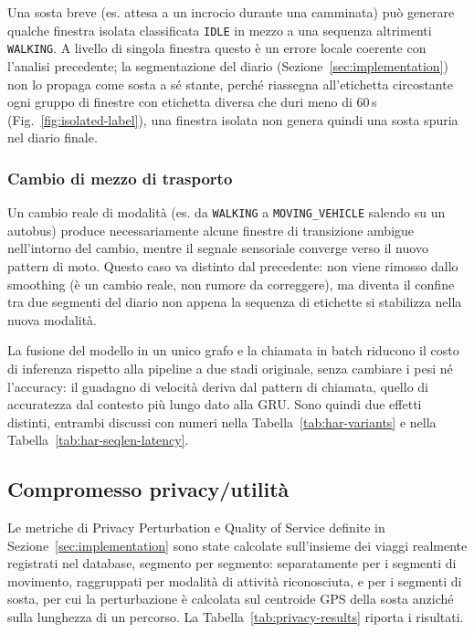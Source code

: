 \documentclass[conference]{IEEEtran}
\begin{document}
Una sosta breve
(es. attesa a un incrocio durante una camminata) può generare qualche
finestra isolata classificata \texttt{IDLE} in mezzo a una sequenza
altrimenti \texttt{WALKING}. A livello di singola finestra questo è un
errore locale coerente con l'analisi precedente; la segmentazione del
diario (Sezione~\ref{sec:implementation}) non lo propaga come sosta a
sé stante, perché riassegna all'etichetta circostante ogni gruppo di
finestre con etichetta diversa che duri meno di 60\,s
(Fig.~\ref{fig:isolated-label}), una finestra isolata non genera
quindi una sosta spuria nel diario finale.

\subsubsection{Cambio di mezzo di trasporto}

Un cambio reale di modalità
(es. da \texttt{WALKING} a \texttt{MOVING\_VEHICLE} salendo su un
autobus) produce necessariamente alcune finestre di transizione
ambigue nell'intorno del cambio, mentre il segnale sensoriale converge
verso il nuovo pattern di moto. Questo caso va distinto dal
precedente: non viene rimosso dallo smoothing (è un cambio reale, non
rumore da correggere), ma diventa il confine tra due segmenti del
diario non appena la sequenza di etichette si stabilizza nella nuova
modalità.

La fusione del modello in un unico grafo e la chiamata in batch
riducono il costo di inferenza rispetto alla pipeline a due stadi
originale, senza cambiare i pesi né l'accuracy: il guadagno di
velocità deriva dal pattern di chiamata, quello di accuratezza dal
contesto più lungo dato alla GRU. Sono quindi due effetti distinti,
entrambi discussi con numeri nella Tabella~\ref{tab:har-variants} e
nella Tabella~\ref{tab:har-seqlen-latency}.

\subsection{Compromesso privacy/utilità}

Le metriche di Privacy Perturbation e Quality of Service definite in
Sezione~\ref{sec:implementation} sono state calcolate sull'insieme dei
viaggi realmente registrati nel database, segmento per segmento:
separatamente per i segmenti di movimento, raggruppati per modalità
di attività riconosciuta, e per i segmenti di sosta, per cui la
perturbazione è calcolata sul centroide GPS della sosta anziché sulla
lunghezza di un percorso. La Tabella~\ref{tab:privacy-results}
riporta i risultati.
\end{document}
